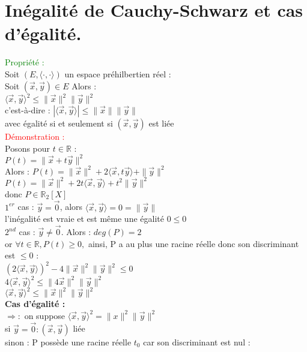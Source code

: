 \documentclass{article}
\begin{document}
\section{Inégalité de Cauchy-Schwarz et cas d'égalité.}
\textcolor{green}{Propriété :} \\
Soit $(E,\langle \cdot , \cdot \rangle)$ un espace préhilbertien réel : \\
Soit $(\vec x, \vec y) \in E$ Alors : \\
$\langle \vec x ,\vec y \rangle^2 \leq  \| \vec x \|^2 \| \vec y \|^2$ \\
c'est-à-dire : $|\langle \vec x ,\vec y \rangle| \leq \| \vec x \| \| \vec y \|$ \\
avec égalité si et seulement si $(\vec x, \vec y)$ est liée \\
\textcolor{red}{Démonstration :} \\
Posons pour $t \in \mathbb R$ : \\
$P(t)= \| \vec x + t \vec y \|^2$ \\
Alors : $P(t)= \| \vec x \|^2 +2 \langle \vec x, t \vec y \rangle + \| \vec y \|^2$ \\
$P(t)=\| \vec x \|^2 +2 t \langle \vec x ,\vec y \rangle + t^2 \| \vec y \|^2$ \\
donc $P \in \mathbb R_2 [X]$ \\
$1^{er}$ cas : $\vec y= \vec 0$, alors $\langle \vec x , \vec y \rangle=0= \| \vec y \|$ \\
l'inégalité est vraie et est même une égalité $0 \leq 0$ \\
$2^{nd}$ cas : $\vec y \neq \vec 0$. Alors : $deg(P)=2$ \\
or $\forall t \in \mathbb R, P(t) \geq 0,$ ainsi, P a au plus une racine réelle donc son discriminant est $\leq 0$ : \\
$(2 \langle \vec x , \vec y \rangle)^2-4 \| \vec x \|^2 \| \vec y \|^2 \leq 0$ \\
$4 \langle \vec x ,\vec y \rangle^2 \leq \| 4 \vec x \|^2 \| \vec y \|^2$ \\
$ \langle \vec x ,\vec y \rangle^2 \leq \|  \vec x \|^2 \| \vec y \|^2$ \\
{\bf Cas d'égalité : }\\
$\Rightarrow :$ on suppose $\langle \vec x, \vec y \rangle^2= \| x \|^2 \| \vec y \|^2$ \\
si $\vec y= \vec 0 : (\vec x, \vec y)$ liée \\
sinon :  P possède une racine réelle $t_0$ car son discriminant est nul : \\
\end{document}
